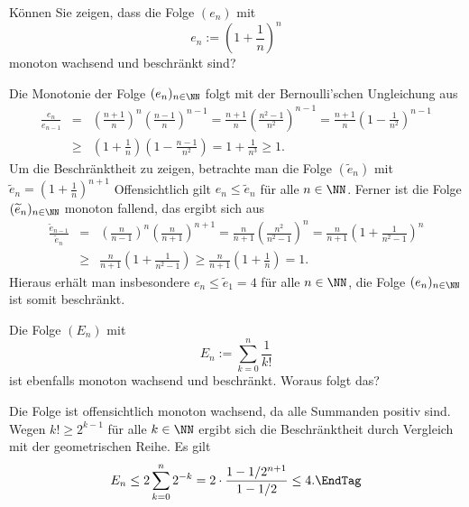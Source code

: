 \begin{frage}%
  \label{Euler}
  Können Sie zeigen, dass die Folge $(e_n)$ mit 
  \[
  e_n := \left( 1+\frac{1}{n} \right)^n 
  \]
  monoton wachsend und beschränkt sind?
\end{frage} 

\begin{antwort}
  Die Monotonie der Folge $(e_n)_{n\in\NN}$ folgt mit der Bernoulli'schen 
  Ungleichung aus
  \begin{eqnarray*}
    \frac{e_n}{e_{n-1}} &=& \left( \frac{n+1}{n} \right)^n 
    \left( \frac{n-1}{n} \right)^{n-1} = 
    \frac{n+1}{n} \left( \frac{n^2-1}{n^2} \right)^{n-1} =
    \frac{n+1}{n} \left( 1-\frac{1}{n^2} \right)^{n-1} \\
    & \ge & \left( 1+\frac{1}{n} \right) \left( 1-\frac{n-1}{n^2} \right) =
    1+\frac{1}{n^3} \ge 1.
  \end{eqnarray*}
  Um die Beschränktheit zu zeigen, betrachte man die Folge 
  $(\widetilde{e}_n)$ mit $\widetilde{e}_n= \left( 1+ \frac{1}{n} \right)^{n+1}$ 
  Offensichtlich gilt $e_n\le \widetilde{e}_n$ für alle 
  $n\in\NN$. Ferner ist die Folge $(\widetilde{e}_n)_{n\in\NN}$ monoton 
  fallend, das ergibt sich aus 
  \begin{eqnarray*}
    \frac{\widetilde{e}_{n-1}}{\widetilde{e}_{n}} &=& \left( \frac{n}{n-1} \right)^n 
    \left( \frac{n}{n+1} \right)^{n+1} = 
    \frac{n}{n+1} \left( \frac{n^2}{n^2-1} \right)^{n} =
    \frac{n}{n+1} \left( 1+\frac{1}{n^2-1} \right)^{n} \\
    & \ge & \frac{n}{n+1} \left( 1+\frac{1}{n^2-1} \right) 
    \ge \frac{n}{n+1} \left( 1+\frac{1}{n} \right) =1. 
  \end{eqnarray*}
  Hieraus erhält man insbesondere 
  $e_n \le \widetilde{e}_1=4$ für alle $n\in\NN$, die 
  Folge $(e_n)_{n\in\NN}$ ist somit beschränkt.\AntEnd
\end{antwort}

\begin{frage}
  Die Folge $(E_n)$ mit  
  \[
  E_n := \sum_{k=0}^n \frac{1}{k!}
  \]
  ist ebenfalls monoton wachsend und beschränkt. Woraus folgt das?
\end{frage}

\begin{antwort}
  Die Folge ist offensichtlich monoton wachsend, da alle Summanden 
  positiv sind. Wegen $k! \ge 2^{k-1}$ für alle $k\in\NN$ ergibt sich die 
  Beschränktheit durch Vergleich mit der geometrischen Reihe. Es gilt
  \begin{equation}
    E_n \le 2 \sum_{k=0}^{n} 2^{-k} = 2\cdot 
    \frac{1-1/2^{n+1}}{1-1/2} \le 4.   \EndTag
  \end{equation}
\end{antwort} 

